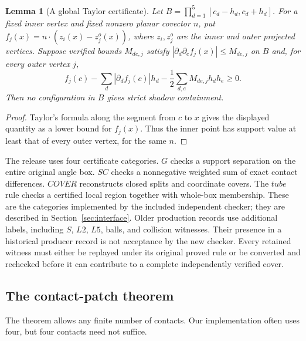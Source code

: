 \documentclass[11pt]{amsart}
\newtheorem{lemma}[theorem]{Lemma}
\theoremstyle{definition}
\theoremstyle{remark}
\begin{document}
\begin{lemma}[A global Taylor certificate]\label{lem:global}
Let $B=\prod_{d=1}^5[c_d-h_d,c_d+h_d]$. For a fixed inner vertex and
fixed nonzero planar covector $n$, put
$f_j(x)=n\cdot(z_i(x)-z_j^o(x))$, where $z_i,z_j^o$ are the inner and
outer projected vertices. Suppose verified bounds $M_{de,j}$ satisfy
$|\partial_d\partial_e f_j(x)|\le M_{de,j}$ on $B$ and, for every outer
vertex $j$,
\[
 f_j(c)-\sum_d|\partial_df_j(c)|h_d
       -\frac12\sum_{d,e}M_{de,j}h_dh_e\ge0.
\]
Then no configuration in $B$ gives strict shadow containment.
\end{lemma}
\begin{proof}
Taylor's formula along the segment from $c$ to $x$ gives the displayed
quantity as a lower bound for $f_j(x)$. Thus the inner point has support
value at least that of every outer vertex, for the same $n$.
\end{proof}

The release uses four certificate categories. $G$ checks a support
separation on the entire original angle box. $SC$ checks a nonnegative
weighted sum of exact contact differences. $COVER$ reconstructs closed
splits and coordinate covers. The $tube$ rule checks a certified local
region together with whole-box membership. These are the categories
implemented by the included independent checker; they are described in
Section~\ref{sec:interface}. Older production records use additional
labels, including $S$, $L2$, $L5$, balls, and collision witnesses. Their
presence in a historical producer record is not acceptance by the new
checker. Every retained witness must either be replayed under its original
proved rule or be converted and rechecked before it can contribute to a
complete independently verified cover.

\subsection{The contact-patch theorem}
The theorem allows any finite number of contacts. Our implementation
often uses four, but four contacts need not suffice.
\end{document}
